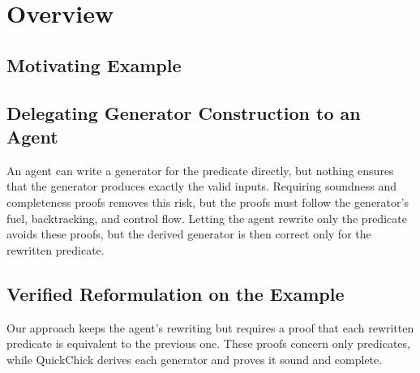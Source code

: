 \section{Overview}
\label{sec:problem}

\subsection{Motivating Example}
\label{sec:motivating-example}


\subsection{Delegating Generator Construction to an Agent}
\label{sec:direct-delegation}

An agent can write a generator for the predicate directly, but nothing ensures
that the generator produces exactly the valid inputs.
Requiring soundness and completeness proofs removes this risk, but the proofs
must follow the generator's fuel, backtracking, and control flow.
Letting the agent rewrite only the predicate avoids these proofs, but the
derived generator is then correct only for the rewritten predicate.

\subsection{Verified Reformulation on the Example}
\label{sec:walkthrough}

Our approach keeps the agent's rewriting but requires a proof that each
rewritten predicate is equivalent to the previous one.
These proofs concern only predicates, while QuickChick derives each generator
and proves it sound and complete.
